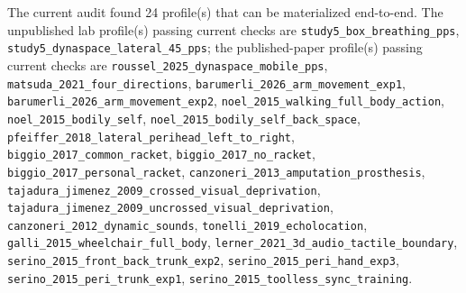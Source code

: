 \documentclass[11pt]{article}
\begin{document}
The current audit found 24 profile(s) that can be materialized end-to-end. The unpublished lab profile(s) passing current checks are \texttt{study5\_\allowbreak{}box\_\allowbreak{}breathing\_\allowbreak{}pps}, \texttt{study5\_\allowbreak{}dynaspace\_\allowbreak{}lateral\_\allowbreak{}45\_\allowbreak{}pps}; the published-paper profile(s) passing current checks are \texttt{roussel\_\allowbreak{}2025\_\allowbreak{}dynaspace\_\allowbreak{}mobile\_\allowbreak{}pps}, \texttt{matsuda\_\allowbreak{}2021\_\allowbreak{}four\_\allowbreak{}directions}, \texttt{barumerli\_\allowbreak{}2026\_\allowbreak{}arm\_\allowbreak{}movement\_\allowbreak{}exp1}, \texttt{barumerli\_\allowbreak{}2026\_\allowbreak{}arm\_\allowbreak{}movement\_\allowbreak{}exp2}, \texttt{noel\_\allowbreak{}2015\_\allowbreak{}walking\_\allowbreak{}full\_\allowbreak{}body\_\allowbreak{}action}, \texttt{noel\_\allowbreak{}2015\_\allowbreak{}bodily\_\allowbreak{}self}, \texttt{noel\_\allowbreak{}2015\_\allowbreak{}bodily\_\allowbreak{}self\_\allowbreak{}back\_\allowbreak{}space}, \texttt{pfeiffer\_\allowbreak{}2018\_\allowbreak{}lateral\_\allowbreak{}perihead\_\allowbreak{}left\_\allowbreak{}to\_\allowbreak{}right}, \texttt{biggio\_\allowbreak{}2017\_\allowbreak{}common\_\allowbreak{}racket}, \texttt{biggio\_\allowbreak{}2017\_\allowbreak{}no\_\allowbreak{}racket}, \texttt{biggio\_\allowbreak{}2017\_\allowbreak{}personal\_\allowbreak{}racket}, \texttt{canzoneri\_\allowbreak{}2013\_\allowbreak{}amputation\_\allowbreak{}prosthesis}, \texttt{tajadura\_\allowbreak{}jimenez\_\allowbreak{}2009\_\allowbreak{}crossed\_\allowbreak{}visual\_\allowbreak{}deprivation}, \texttt{tajadura\_\allowbreak{}jimenez\_\allowbreak{}2009\_\allowbreak{}uncrossed\_\allowbreak{}visual\_\allowbreak{}deprivation}, \texttt{canzoneri\_\allowbreak{}2012\_\allowbreak{}dynamic\_\allowbreak{}sounds}, \texttt{tonelli\_\allowbreak{}2019\_\allowbreak{}echolocation}, \texttt{galli\_\allowbreak{}2015\_\allowbreak{}wheelchair\_\allowbreak{}full\_\allowbreak{}body}, \texttt{lerner\_\allowbreak{}2021\_\allowbreak{}3d\_\allowbreak{}audio\_\allowbreak{}tactile\_\allowbreak{}boundary}, \texttt{serino\_\allowbreak{}2015\_\allowbreak{}front\_\allowbreak{}back\_\allowbreak{}trunk\_\allowbreak{}exp2}, \texttt{serino\_\allowbreak{}2015\_\allowbreak{}peri\_\allowbreak{}hand\_\allowbreak{}exp3}, \texttt{serino\_\allowbreak{}2015\_\allowbreak{}peri\_\allowbreak{}trunk\_\allowbreak{}exp1}, \texttt{serino\_\allowbreak{}2015\_\allowbreak{}toolless\_\allowbreak{}sync\_\allowbreak{}training}.
\end{document}
